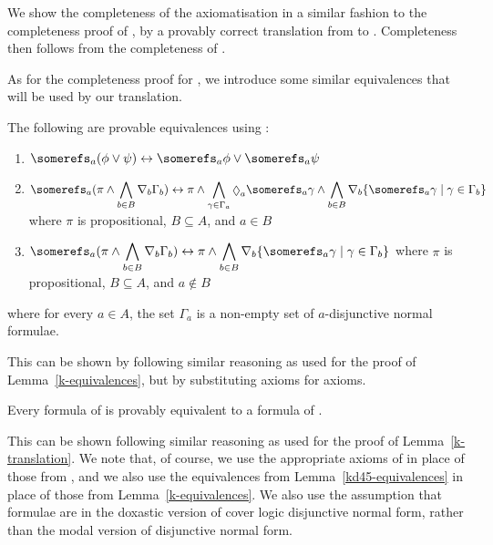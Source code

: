 We show the completeness of the axiomatisation \axiomKDF{} in a similar fashion
to the completeness proof of \axiomKF{}, by a provably correct translation from
\langF{} to \lang{}. Completeness then follows from the completeness of
\logicKD{}.

As for the completeness proof for \axiomKF{}, we introduce some similar
equivalences that will be used by our translation.

\begin{lemma}\label{kd45-equivalences}
The following are provable equivalences using \axiomKDF{}:
\begin{enumerate}
\item $\displaystyle \somerefs_a (\phi \lor \psi) \iff
\somerefs_a \phi \lor \somerefs_a \psi$
\item $\displaystyle \somerefs_a (\pi \land \bigwedge_{b
\in B} \covers_b \Gamma_b) \iff \pi \land \bigwedge_{\gamma \in \Gamma_a}
\suspects_a \somerefs_a \gamma \land \bigwedge_{b \in B} \covers_b \{\somerefs_a
\gamma \mid \gamma \in \Gamma_b\}$ where $\pi$ is propositional, $B \subseteq
A$, and $a \in B$
\item $\displaystyle \somerefs_a (\pi \land \bigwedge_{b
\in B} \covers_b \Gamma_b) \iff \pi \land \bigwedge_{b \in B} \covers_b
\{\somerefs_a \gamma \mid \gamma \in \Gamma_b\}$ where $\pi$ is propositional,
$B \subseteq A$, and $a \notin B$
\end{enumerate}
where for every $a \in A$, the set $\Gamma_a$ is a non-empty set of
$a$-disjunctive normal formulae.
\end{lemma}

This can be shown by following similar reasoning as used for the proof of
Lemma~\ref{k-equivalences}, but by substituting \axiomKF{} axioms for
\axiomKDF{} axioms.

\begin{lemma}\label{kd45-translation}
Every formula of \logicKDF{} is provably equivalent to a formula of \logicKD{}.
\end{lemma}

This can be shown following similar reasoning as used for the proof of
Lemma~\ref{k-translation}. We note that, of course, we use the appropriate
axioms of \axiomKDF{} in place of those from \axiomKF{}, and we also use the
equivalences from Lemma~\ref{kd45-equivalences} in place of those from
Lemma~\ref{k-equivalences}. We also use the assumption that formulae are in
the doxastic version of cover logic disjunctive normal form, rather than the
modal version of disjunctive normal form.

